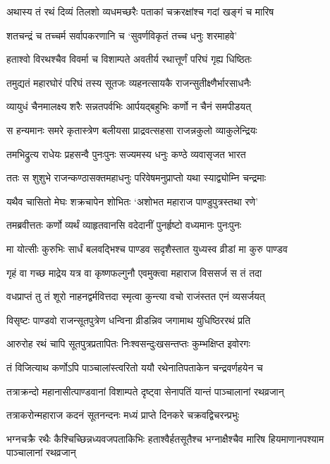 \twolineshloka
{अथास्य तं रथं दिव्यं तिलशो व्यधमच्छरैः}
{पताकां चक्ररक्षांश्च गदां खङ्गं च मारिष}


\twolineshloka
{शतचन्द्रं च तच्चर्म सर्वापकरणानि च}
{`सुवर्णविकृतं तच्च धनुः शरमाहवे'}


\twolineshloka
{हताश्वो विरथश्चैव विवर्मा च विशाम्पते}
{अवतीर्य रथात्तूर्णं परिघं गृह्य धिष्ठितः}


\twolineshloka
{तमुद्यतं महारघोरं परिघं तस्य सूतजः}
{व्यहनत्सायकै राजन्सुतीक्ष्णैर्भारसाधनैः}


\twolineshloka
{व्यायुधं चैनमालक्ष्य शरैः सन्नतपर्वभिः}
{आर्पयद्बहुभिः कर्णो न चैनं समपीडयत्}


\twolineshloka
{स हन्यमानः समरे कृतास्त्रेण बलीयसा}
{प्राद्रवत्सहसा राजन्नकुलो व्याकुलेन्द्रियः}


\twolineshloka
{तमभिद्रुत्य राधेयः प्रहसन्वै पुनःपुनः}
{सज्यमस्य धनुः कण्ठे व्यवासृजत भारत}


\twolineshloka
{ततः स शुशुभे राजन्कण्ठासक्तमहाधनुः}
{परिवेषमनुप्राप्तो यथा स्याद्व्योम्नि चन्द्रमाः}


\twolineshloka
{यथैव चासितो मेघः शक्रचापेन शोभितः}
{`अशोभत महाराज पाण्डुपुत्रस्तथा रणे'}


\twolineshloka
{तमब्रवीत्ततः कर्णो व्यर्थं व्याहृतवानसि}
{वदेदानीं पुनर्हृष्टो वध्यमानः पुनःपुनः}


\twolineshloka
{मा योत्सीः कुरुभिः सार्धं बलवद्भिश्च पाण्डव}
{सदृशैस्तात युध्यस्व व्रीडां मा कुरु पाण्डव}


\twolineshloka
{गृहं वा गच्छ माद्रेय यत्र वा कृष्णफल्गुनौ}
{एवमुक्त्वा महाराज विससर्ज स तं तदा}


\twolineshloka
{वधप्राप्तं तु तं शूरो नाहनद्वर्मवित्तदा}
{स्मृत्वा कुन्त्या वचो राजंस्तत एनं व्यसर्जयत्}


\twolineshloka
{विसृष्टः पाण्डवो राजन्सूतपुत्रेण धन्विना}
{व्रीडन्निव जगामाथ युधिष्ठिररथं प्रति}


\twolineshloka
{आरुरोह रथं चापि सूतपुत्रप्रतापितः}
{निःश्वसन्दुःखसन्तप्तः कुम्भक्षिप्त इवोरगः}


\twolineshloka
{तं विजित्याथ कर्णोऽपि पाञ्चालांस्त्वरितो ययौ}
{रथेनातिपताकेन चन्द्रवर्णहयेन च}


\twolineshloka
{तत्राक्रन्दो महानासीत्पाण्डवानां विशाम्पते}
{दृष्ट्वा सेनापतिं यान्तं पाञ्चालानां रथव्रजान्}


\twolineshloka
{तत्राकरोन्महाराज कदनं सूतनन्दनः}
{मध्यं प्राप्ते दिनकरे चक्रवद्विचरन्प्रभुः}


\threelineshloka
{भग्नचक्रै रथैः कैश्चिच्छिन्नध्यवजपताकिभिः}
{हताश्वैर्हतसूतैश्च भग्नाक्षैश्चैव मारिष}
{हियमाणानपश्याम पाञ्चालानां रथव्रजान्}


